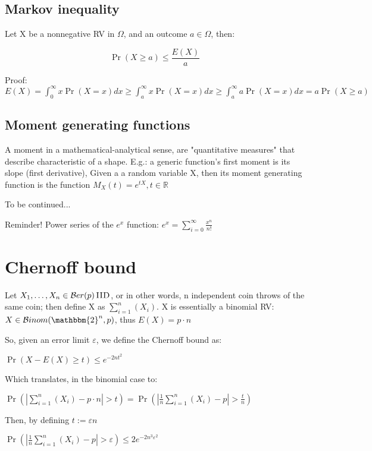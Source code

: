 \documentclass{report}
\newcommand{\binary}{\mathbbm{2}}
\newcommand{\binomdist}{\mathcal{B}inom}
\newcommand{\berdist}{\mathcal{B}er}
\newcommand{\iid}{\,\textsc{IID}}
\newcommand{\coin}{\berdist}
\begin{document}
\subsection{Markov inequality}
	
	Let X be a nonnegative RV in $\Omega$, and an outcome $a \in \Omega$, then:
	
	\begin{equation}
	\Pr(X \geq a) \leq \frac{E(X)}{a}
	\end{equation}
	
	Proof: $ E(X) = \int_{0}^{\infty}x\Pr(X=x)dx \geq \int_{a}^{\infty}x\Pr(X = x)dx \geq \int_{a}^{\infty}a\Pr(X = x)dx = a\Pr(X \geq a)$
	
\subsection{Moment generating functions}
	
	A moment in a mathematical-analytical sense, are "quantitative measures" that describe characteristic of a shape. E.g.: a generic function's first moment is its slope (first derivative), 
	Given a a random variable X, then its moment generating function is the function $M_X(t) = e^{tX}, t \in \mathbb{R}$
	
	To be continued...
	
	Reminder! Power series of the $e^x$ function: $\displaystyle e^x = \sum_{i=0}^{\infty}\frac{x^n}{n!}$
	
	
\section{Chernoff bound}
	
	Let $X_1, \dots, X_n \in \coin(p) \iid$, or in other words, n independent coin throws of the same coin; then define X as $\sum_{i=1}^{n}(X_i)$. X is essentially a binomial RV: $X \in \binomdist(\binary^n, p)$, thus $E(X)=p\cdot n$
	
	So, given an error limit $\varepsilon$, we define the Chernoff bound as:
	
	$\displaystyle \Pr(X-E(X) \geq t)\leq e^{-2nt^2}$
	
	Which translates, in the binomial case to:
	
	$\displaystyle \Pr(|\sum_{i=1}^{n}(X_i) - p \cdot n| > t) = \Pr(|\frac{1}{n}\sum_{i=1}^{n}(X_i) - p| > \frac{t}{n})$

	Then, by defining $t := \varepsilon n$
	
	$\Pr(|\frac{1}{n}\sum_{i=1}^{n}(X_i) - p| > \varepsilon) \leq 2e^{-2n^3\varepsilon^2}$
	
\end{document}
